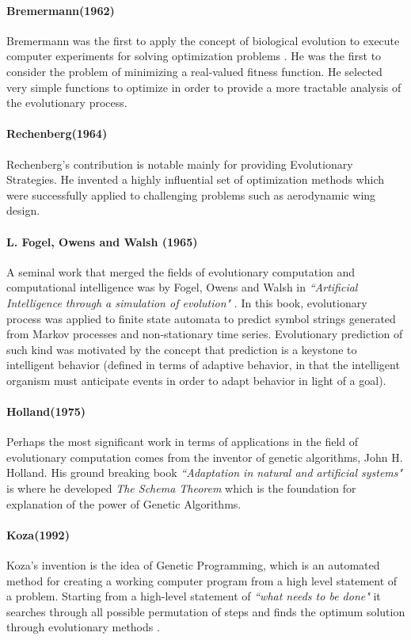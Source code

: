 \paragraph{Bremermann(1962)}
Bremermann was the first to apply the concept of biological evolution to execute computer experiments for solving optimization problems \cite{bremermann1962}. He was the first to consider the problem of minimizing a real-valued fitness function. He selected very simple functions to optimize in order to provide a more tractable analysis of the evolutionary process.

\paragraph{Rechenberg(1964)}
Rechenberg's contribution is notable mainly for providing Evolutionary Strategies. He invented a highly influential set of optimization methods which were successfully applied to challenging problems such as aerodynamic wing design. \cite{rechenberg1973}

\paragraph{L. Fogel, Owens and Walsh (1965)}
A seminal work that merged the fields of evolutionary computation and computational intelligence was by Fogel, Owens and Walsh in \textsl{``Artificial Intelligence through a simulation of evolution"} \cite{fogel1966}. In this book, evolutionary process was applied to finite state automata to predict symbol strings generated from Markov processes and non-stationary time series. Evolutionary prediction of such kind was motivated by the concept that prediction is a keystone to intelligent behavior (defined in terms of adaptive behavior, in that the intelligent organism must anticipate events in order to adapt behavior in light of a goal). 

\paragraph{Holland(1975)}
Perhaps the most significant work in terms of applications in the field of evolutionary computation comes from the inventor of genetic algorithms, John H. Holland. His ground breaking book \textsl{``Adaptation in natural and artificial systems"} \cite{holland1975} is where he developed \textit{The Schema Theorem} which is the foundation for explanation of the power of Genetic Algorithms.

\paragraph{Koza(1992)}
Koza's invention is the idea of Genetic Programming, which is an automated method for creating a working computer program from a high level statement of a problem. Starting from a high-level statement of \textsl{``what needs to be done"} it searches through all possible permutation of steps and finds the optimum solution through evolutionary methods \cite{koza1992}.

